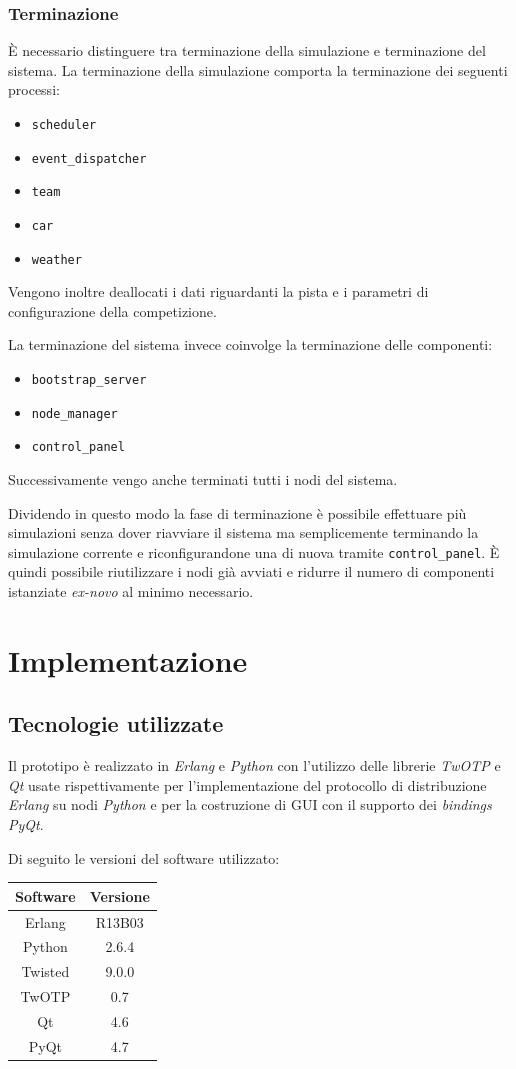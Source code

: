 \documentclass[11pt,a4paper]{report}
\newcommand{\Erlang}{\textsl{Erlang}}
\newcommand{\Python}{\textsl{Python}}
\begin{document}
\subsection*{Terminazione}
\`E necessario distinguere tra terminazione della simulazione e terminazione del sistema.
La terminazione della simulazione comporta la terminazione dei seguenti processi:
\begin{itemize}
\item \texttt{scheduler}
\item \texttt{event\_dispatcher}
\item \texttt{team}
\item \texttt{car}
\item \texttt{weather}
\end{itemize}
Vengono inoltre deallocati i dati riguardanti la pista e i parametri di configurazione della competizione.

La terminazione del sistema invece coinvolge la terminazione delle componenti:
\begin{itemize}
\item \texttt{bootstrap\_server}
\item \texttt{node\_manager}
\item \texttt{control\_panel}
\end{itemize}
Successivamente vengo anche terminati tutti i nodi del sistema.

Dividendo in questo modo la fase di terminazione è possibile effettuare più simulazioni senza dover riavviare il sistema ma semplicemente terminando la simulazione corrente e riconfigurandone una di nuova tramite \texttt{control\_panel}. \`E quindi possibile riutilizzare i nodi già avviati e ridurre il numero di componenti istanziate \textit{ex-novo} al minimo necessario.


\chapter{Implementazione}
\section{Tecnologie utilizzate}
Il prototipo è realizzato in \Erlang{} e \Python{} con l'utilizzo delle librerie \textsl{TwOTP} e \textsl{Qt} usate rispettivamente per l'implementazione del protocollo di distribuzione \Erlang{} su nodi \Python{} e per la costruzione di GUI con il supporto dei \textit{bindings} \textsl{PyQt}.

Di seguito le versioni del software utilizzato:
\begin{center}
\begin{tabular}{c|c}
\textbf{Software} & \textbf{Versione} \\
\hline
Erlang & R13B03 \\
\hline
Python & 2.6.4 \\
\hline
Twisted & 9.0.0 \\
TwOTP & 0.7 \\
\hline
Qt & 4.6 \\
PyQt & 4.7 \\
\end{tabular}
\end{center}
\end{document}
